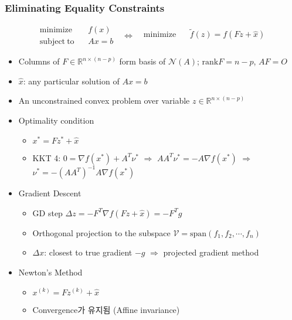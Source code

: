 \subsubsection*{Eliminating Equality Constraints}
\begin{equation}\begin{aligned}
    \mathrm{minimize}~~&~~f(x) \\
    \mathrm{subject~to}~~&~~Ax=b
\end{aligned}~~~\Leftrightarrow~~~\begin{aligned}
    \mathrm{minimize}~~&~~\tilde{f}(z)=f(Fz+\hat{x}) \\ {}
\end{aligned}\end{equation}
\begin{itemize}
    \item Columns of $F\in\mathbb{R}^{n\times(n-p)}$ form basis of $\mathcal{N}(A)$; $\mathrm{rank}F = n-p$, $AF=O$
    \item $\hat{x}$: any particular solution of $Ax=b$
    \item An unconstrained convex problem over variable $z\in\mathbb{R}^{n\times(n-p)}$
    \item Optimality condition
    \begin{itemize}
        \item $x^\ast=Fz^\ast+\hat{x}$
        \item KKT 4: $0=\nabla f(x^\ast)+A^T\nu^\ast$ $\Rightarrow$ $AA^T\nu^\ast=-A\nabla f(x^\ast)$ $\Rightarrow$ $\nu^\ast=-(AA^T)^{-1}A\nabla f(x^\ast)$
    \end{itemize}
    \item Gradient Descent
    \begin{itemize}
        \item GD step $\Delta z=-F^T\nabla f(Fz+\hat{x})=-F^Tg$
        \item Orthogonal projection to the subspace $\mathcal{V}=\mathrm{span}(f_1,f_2,\cdots,f_n)$
        \item $\Delta x$: closest to true gradient $-g$ $\Rightarrow$ projected gradient method
    \end{itemize}
    \item Newton's Method
    \begin{itemize}
        \item $x^{(k)}=Fz^{(k)}+\hat{x}$
        \item Convergence가 유지됨 (Affine invariance)
    \end{itemize}
\end{itemize}

